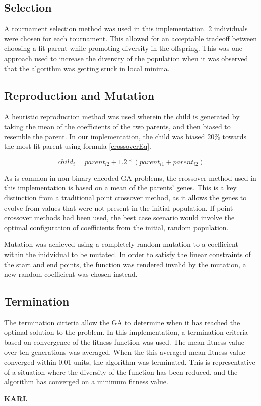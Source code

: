 \subsection{Selection}
A tournament selection method was used in this implementation. 2 individuals were chosen for each tournament. This allowed for an acceptable tradeoff between choosing a fit parent while promoting diversity in the offspring. This was one approach used to increase the diversity of the population when it was observed that the algorithm was getting stuck in local minima.

\subsection{Reproduction and Mutation}
A heuristic reproduction method was used wherein the child is generated by taking the mean of the coefficients of the two parents, and then biased to resemble the parent. In our implementation, the child was biased 20\% towards the most fit parent using formula \ref{crossoverEq}.

\begin{equation} \label{crossoverEq}
child_i = parent_{i2} + 1.2 * (parent_{i1} + parent_{i2})
\end{equation}

As is common in non-binary encoded GA problems, the crossover method used in this implementation is based on a mean of the parents' genes. This is a key distinction from a traditional point crossover method, as it allows the genes to evolve from values that were not present in the initial population. If point crossover methods had been used, the best case scenario would involve the optimal configuration of coefficients from the initial, random population.

Mutation was achieved using a completely random mutation to a coefficient within the inidvidual to be mutated. In order to satisfy the linear constraints of the start and end points, the function was rendered invalid by the mutation, a new random coefficient was chosen instead.

\subsection{Termination}
The termination cirteria allow the GA to determine when it has reached the optimal solution to the problem. In this implementation, a termination criteria based on convergence of the fitness function was used. The mean fitness value over ten generations was averaged. When the this averaged mean fitness value converged within 0.01 units, the algorithm was terminated. This is representative of a situation where the diversity of the function has been reduced, and the algorithm has converged on a minimum fitness value. 

\textbf{KARL}

\lipsum[1]
